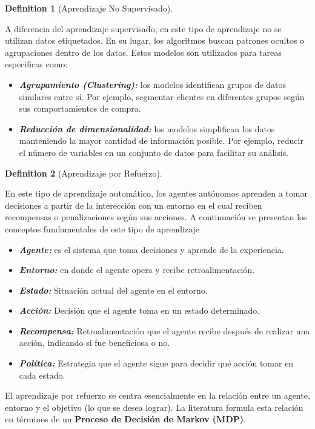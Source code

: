 \documentclass[
  letterpaper,
  DIV=11,
  numbers=noendperiod]{scrreprt}
\providecommand{\tightlist}{%
  \setlength{\itemsep}{0pt}\setlength{\parskip}{0pt}}
\theoremstyle{definition}
\newtheorem{definition}{Definition}[chapter]
\theoremstyle{remark}
\begin{document}
\begin{definition}[Aprendizaje No
Supervisado]\protect\hypertarget{def-sub}{}\label{def-sub}

A diferencia del aprendizaje supervisado, en este tipo de aprendizaje no
se utilizan datos etiquetados. En su lugar, los algoritmos buscan
patrones ocultos o agrupaciones dentro de los datos. Estos modelos son
utilizados para tareas especificas como:

\begin{itemize}
\tightlist
\item
  \textbf{\emph{Agrupamiento (Clustering):}} los modelos identifican
  grupos de datos similares entre sí. Por ejemplo, segmentar clientes en
  diferentes grupos según sus comportamientos de compra.
\item
  \textbf{\emph{Reducción de dimensionalidad:}} los modelos simplifican
  los datos manteniendo la mayor cantidad de información posible. Por
  ejemplo, reducir el número de variables en un conjunto de datos para
  facilitar su análisis.
\end{itemize}

\end{definition}

\begin{definition}[Aprendizaje por
Refuerzo]\protect\hypertarget{def-sub}{}\label{def-sub}

En este tipo de aprendizaje automático, los agentes autónomos aprenden a
tomar decisiones a partir de la interección con un entorno en el cual
reciben recompensas o penalizaciones según sus acciones. A continuación
se presentan los conceptos fundamentales de este tipo de aprendizaje

\begin{itemize}
\tightlist
\item
  \textbf{\emph{Agente:}} es el sistema que toma decisiones y aprende de
  la experiencia.
\item
  \textbf{\emph{Entorno:}} en donde el agente opera y recibe
  retroalimentación.
\item
  \textbf{\emph{Estado:}} Situación actual del agente en el entorno.
\item
  \textbf{\emph{Acción:}} Decisión que el agente toma en un estado
  determinado.
\item
  \textbf{\emph{Recompensa:}} Retroalimentación que el agente recibe
  después de realizar una acción, indicando si fue beneficiosa o no.
\item
  \textbf{\emph{Política:}} Estrategia que el agente sigue para decidir
  qué acción tomar en cada estado.
\end{itemize}

El aprendizaje por refuerzo se centra esencialmente en la relación entre
un agente, entorno y el objetivo (lo que se desea lograr). La literatura
formula esta relación en términos de un \textbf{Proceso de Decisión de
Markov (MDP)}.

\end{definition}
\end{document}
